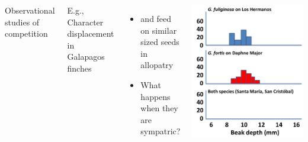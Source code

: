 \begin{frame}[t]
    \begin{adjustwidth}{-2em}{-1.5em}
        \begin{columns}


            \vspace{-5mm}
            Observational studies of competition

            \vspace{2mm}
            E.g., Character displacement in Galapagos finches

            \begin{itemize}
                \item {} and 
                    feed on similar sized seeds in allopatry

                    \vspace{2mm}
                \item What happens when they are sympatric?

            \end{itemize}


            \includegraphics[width=\columnwidth]{beak-comp.png}

        \end{columns}
    \end{adjustwidth}
\end{frame}

